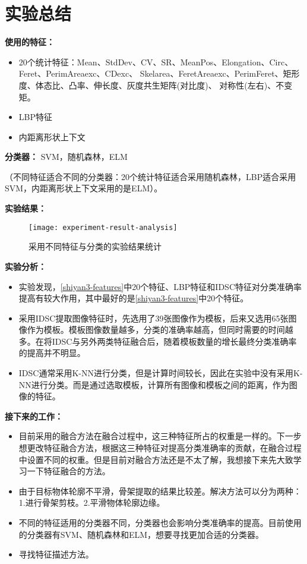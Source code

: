 \section{实验总结}

\textbf{使用的特征：}
    \begin{itemize}
    \item 20个统计特征：Mean、StdDev、CV、SR、MeanPos、Elongation、Circ、Feret、PerimAreaexc、CDexc、 Skelarea、FeretAreaexc、PerimFeret、矩形度、体态比、凸率、伸长度、灰度共生矩阵(对比度)、 对称性(左右)、不变矩。
    \item LBP特征
    \item 内距离形状上下文
    \end{itemize}
    
\textbf{分类器：} SVM，随机森林，ELM

（不同特征适合不同的分类器：20个统计特征适合采用随机森林，LBP适合采用SVM，内距离形状上下文采用的是ELM）。

\textbf{实验结果：}
\begin{figure}[!ht]
\centering
\texttt{[image: experiment-result-analysis]}
\caption{采用不同特征与分类的实验结果统计}
\label{fig:experiment-result-analysis}
\end{figure}

\textbf{实验分析：}
\begin{itemize}
\item 实验发现，\ref{shiyan3-features}中20个特征、LBP特征和IDSC特征对分类准确率提高有较大作用，其中最好的是\ref{shiyan3-features}中20个特征。
\item 采用IDSC提取图像特征时，先选用了39张图像作为模板，后来又选用65张图像作为模板。模板图像数量越多，分类的准确率越高，但同时需要的时间越多。在将IDSC与另外两类特征融合后，随着模板数量的增长最终分类准确率的提高并不明显。
\item IDSC通常采用K-NN进行分类，但是计算时间较长，因此在实验中没有采用K-NN进行分类。而是通过选取模板，计算所有图像和模板之间的距离，作为图像的特征。

\end{itemize}

\textbf{接下来的工作：}
\begin{itemize}
\item 目前采用的融合方法在融合过程中，这三种特征所占的权重是一样的。下一步想更改特征融合方法，根据这三种特征对提高分类准确率的贡献，在融合过程中设置不同的权重。但是目前对融合方法还是不太了解，我想接下来先大致学习一下特征融合的方法。
\item 由于目标物体轮廓不平滑，骨架提取的结果比较差。解决方法可以分为两种：1.进行骨架剪枝。2.平滑物体轮廓边缘。
\item 不同的特征适用的分类器不同，分类器也会影响分类准确率的提高。目前使用的分类器有SVM、随机森林和ELM，想要寻找更加合适的分类器。
\item 寻找特征描述方法。
\end{itemize}


